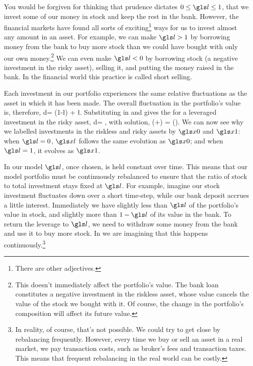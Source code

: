 You would be forgiven for thinking that prudence dictates $0\leq\l\leq1$, \ie that we invest some of our money in stock and keep the rest in the bank. However, the financial markets have found all sorts of exciting\footnote{There are other adjectives.} ways for us to invest almost any amount in an asset. For example, we can make $\l>1$ by borrowing money from the bank to buy more stock than we could have bought with only our own money.\footnote{This doesn't immediately affect the portfolio's value. The bank loan constitutes a negative investment in the riskless asset, whose value cancels the value of the stock we bought with it. Of course, the change in the portfolio's composition will affect its future value.} We can even make $\l<0$ by borrowing stock (a negative investment in the risky asset), selling it, and putting the money raised in the bank. In the financial world this practice is called short selling.

Each investment in our portfolio experiences the same relative fluctuations as the asset in which it has been made. The overall fluctuation in the portfolio's value is, therefore,
\be
d\xl = (1-\l)\xl {} + \l \xl {}.
\ee
Substituting in  and  gives the \SDE for a leveraged investment in the risky asset,
\be
d\xl = ,
\ee
with solution,
\be
\xl(\tn+\Dt) = \xl(\tn)\exp{}.
\ee
We can now see why we labelled investments in the riskless and risky assets by $\xzero$ and $\xone$: when $\l=0$, $\xl$ follows the same evolution as $\xzero$; and when $\l=1$, it evolves as $\xone$.

In our model $\l$, once chosen, is held constant over time. This means that our model portfolio must be continuously rebalanced to ensure that the ratio of stock to total investment stays fixed at $\l$. For example, imagine our stock investment fluctuates down over a short time-step, while our bank deposit accrues a little interest. Immediately we have slightly less than $\l$ of the portfolio's value in stock, and slightly more than $1-\l$ of its value in the bank. To return the leverage to $\l$, we need to withdraw some money from the bank and use it to buy more stock. In  we are imagining that this happens continuously.\footnote{In reality, of course, that's not possible. We could try to get close by rebalancing frequently. However, every time we buy or sell an asset in a real market, we pay transaction costs, such as broker's fees and transaction taxes. This means that frequent rebalancing in the real world can be costly.}

